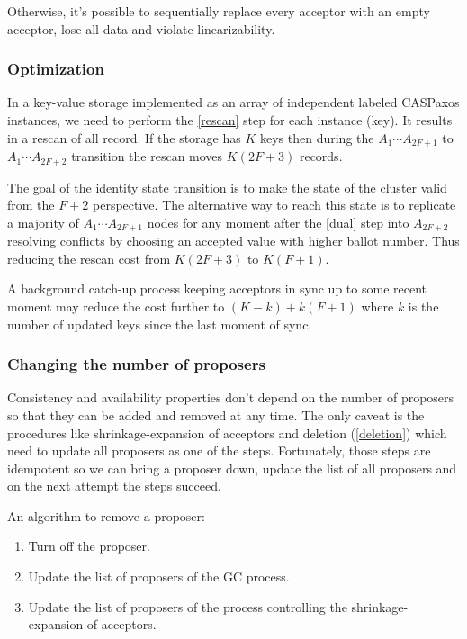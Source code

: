 \documentclass[12pt]{article}
\theoremstyle{definition}
\begin{document}
Otherwise, it's possible to sequentially replace every acceptor with an empty acceptor, lose all data and violate linearizability.

\subsubsection{Optimization}

In a key-value storage implemented as an array of independent labeled CASPaxos instances, we need to perform the \ref{rescan} step for each instance (key). It results in a rescan of all record. If the storage has $K$ keys then during the $A_1 \cdots A_{2F+1}$ to $A_1 \cdots A_{2F+2}$ transition the rescan moves $K(2F+3)$ records.

The goal of the identity state transition is to make the state of the cluster valid from the $F+2$ perspective. The alternative way to reach this state is to replicate a majority of $A_1 \cdots A_{2F+1}$ nodes for any moment after the \ref{dual} step into $A_{2F+2}$ resolving conflicts by choosing an accepted value with higher ballot number. Thus reducing the rescan cost from $K(2F+3)$ to $K(F+1)$.

A background catch-up process keeping acceptors in sync up to some recent moment may reduce the cost further to $(K-k) + k(F+1)$ where $k$ is the number of updated keys since the last moment of sync.

\subsubsection{Changing the number of proposers}

Consistency and availability properties don't depend on the number of proposers so that they can be added and removed at any time. The only caveat is the procedures like shrinkage-expansion of acceptors and deletion (\ref{deletion}) which need to update all proposers as one of the steps. Fortunately, those steps are idempotent so we can bring a proposer down, update the list of all proposers and on the next attempt the steps succeed.

An algorithm to remove a proposer:

\begin{enumerate}
  \item Turn off the proposer.
  \item Update the list of proposers of the GC process.
  \item Update the list of proposers of the process controlling the shrinkage-expansion of acceptors.
\end{enumerate}
\end{document}
